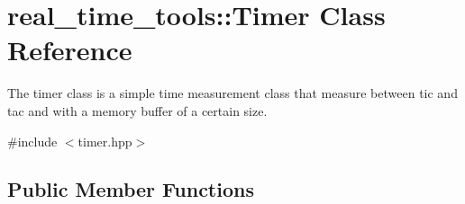 \hypertarget{classreal__time__tools_1_1Timer}{}\section{real\+\_\+time\+\_\+tools\+:\+:Timer Class Reference}
\label{classreal__time__tools_1_1Timer}


The timer class is a simple time measurement class that measure between tic and tac and with a memory buffer of a certain size.  




{\ttfamily \#include $<$timer.\+hpp$>$}

\subsection*{Public Member Functions}
